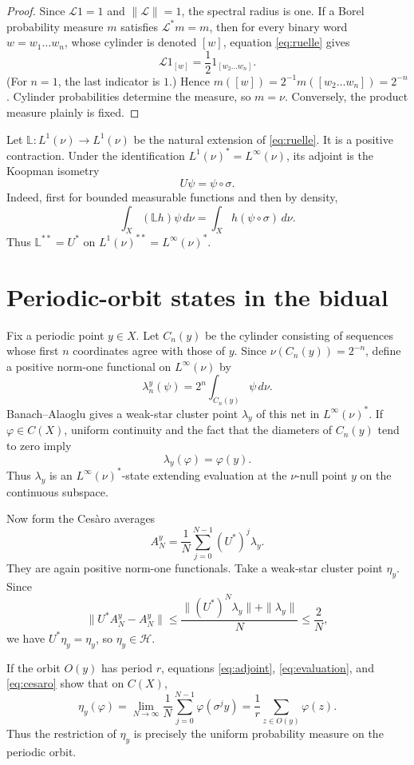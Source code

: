 \documentclass[11pt]{article}
\newcommand{\Lop}{\mathcal L}
\newcommand{\Bop}{\mathbb L}
\newcommand{\Hspace}{\mathcal H}
\begin{document}
\begin{proof}
Since $\Lop 1=1$ and $\|\Lop\|=1$, the spectral radius is one.  If a Borel
probability measure $m$ satisfies $\Lop^*m=m$, then for every binary word
$w=w_1\ldots w_n$, whose cylinder is denoted $[w]$, equation
\eqref{eq:ruelle} gives
\[
 \Lop 1_{[w]}=\frac12 1_{[w_2\ldots w_n]}.
\]
(For $n=1$, the last indicator is $1$.)  Hence
$m([w])=2^{-1}m([w_2\ldots w_n])=2^{-n}$.  Cylinder probabilities determine
the measure, so $m=\nu$.  Conversely, the product measure plainly is fixed.
\end{proof}

Let $\Bop:L^1(\nu)\to L^1(\nu)$ be the natural extension of \eqref{eq:ruelle}.
It is a positive contraction.  Under the identification
$L^1(\nu)^*=L^\infty(\nu)$, its adjoint is the Koopman isometry
\[
 U\psi=\psi\circ\sigma.
 \tag{2}\label{eq:adjoint}
\]
Indeed, first for bounded measurable functions and then by density,
\[
 \int_X(\Bop h)\psi\,d\nu
 =\int_X h(\psi\circ\sigma)\,d\nu.
\]
Thus $\Bop^{**}=U^*$ on $L^1(\nu)^{**}=L^\infty(\nu)^*$.

\section{Periodic-orbit states in the bidual}

Fix a periodic point $y\in X$.  Let $C_n(y)$ be the cylinder consisting of
sequences whose first $n$ coordinates agree with those of $y$.  Since
$\nu(C_n(y))=2^{-n}$, define a positive norm-one functional on
$L^\infty(\nu)$ by
\[
 \lambda_n^y(\psi)=2^n\int_{C_n(y)}\psi\,d\nu.
 \tag{3}\label{eq:concentration}
\]
Banach--Alaoglu gives a weak-star cluster point $\lambda_y$ of this net in
$L^\infty(\nu)^*$.  If $\varphi\in C(X)$, uniform continuity and the fact
that the diameters of $C_n(y)$ tend to zero imply
\[
 \lambda_y(\varphi)=\varphi(y).
 \tag{4}\label{eq:evaluation}
\]
Thus $\lambda_y$ is an $L^\infty(\nu)^*$-state extending evaluation at the
$\nu$-null point $y$ on the continuous subspace.

Now form the Ces\`aro averages
\[
 A_N^y=\frac1N\sum_{j=0}^{N-1}(U^*)^j\lambda_y.
 \tag{5}\label{eq:cesaro}
\]
They are again positive norm-one functionals.  Take a weak-star cluster point
$\eta_y$.  Since
\[
 \|U^*A_N^y-A_N^y\|
 \le \frac{\|(U^*)^N\lambda_y\|+\|\lambda_y\|}{N}
 \le \frac2N,
\]
we have $U^*\eta_y=\eta_y$, so $\eta_y\in\Hspace$.

If the orbit $O(y)$ has period $r$, equations \eqref{eq:adjoint},
\eqref{eq:evaluation}, and \eqref{eq:cesaro} show that on $C(X)$,
\[
 \eta_y(\varphi)
 =\lim_{N\to\infty}\frac1N\sum_{j=0}^{N-1}\varphi(\sigma^j y)
 =\frac1r\sum_{z\in O(y)}\varphi(z).
 \tag{6}\label{eq:orbitmeasure}
\]
Thus the restriction of $\eta_y$ is precisely the uniform probability
measure on the periodic orbit.
\end{document}
